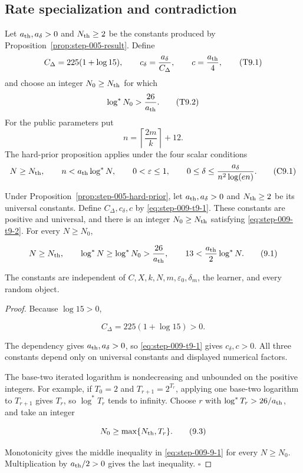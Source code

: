 \subsection{Rate specialization and contradiction}
\label{app:step-009}

Let $a_{\rm th},a_\delta>0$ and $N_{\rm th}\geq2$ be the constants
produced by Proposition~\ref{prop:step-005-result}.  Define
\[
C_\Delta=225(1+\log15),\qquad
c_\delta=\frac{a_\delta}{C_\Delta},\qquad
c=\frac{a_{\rm th}}4,
\tag{T9.1}\label{eq:step-009-t9-1}
\]
and choose an integer $N_0\geq N_{\rm th}$ for which
\[
\log^*N_0>\frac{26}{a_{\rm th}}.
\tag{T9.2}\label{eq:step-009-t9-2}
\]
For the public parameters put
\[
n=\left\lceil\frac{2m}{k}\right\rceil+12.
\tag{T9.3}\label{eq:step-009-t9-3}
\]
The hard-prior proposition applies under the four scalar conditions
\[
N\geq N_{\rm th},\qquad
n<a_{\rm th}\log^*N,
\qquad
0<\varepsilon\leq1,
\qquad
0\leq\delta\leq\frac{a_\delta}{n^2\log(en)}.
\tag{C9.1}\label{eq:step-009-c9-1}
\]



\begin{proposition}
\label{prop:step-009-constants}
Under Proposition~\ref{prop:step-005-hard-prior}, let
\(a_{\rm th},a_\delta>0\) and \(N_{\rm th}\ge2\) be its universal
constants.  Define \(C_\Delta,c_\delta,c\) by \eqref{eq:step-009-t9-1}.  These constants
are positive and universal, and there is an integer
\(N_0\ge N_{\rm th}\) satisfying \eqref{eq:step-009-t9-2}.  For every \(N\ge N_0\),

\[
N\ge N_{\rm th},
\qquad
\log^*N\ge\log^*N_0>\frac{26}{a_{\rm th}},
\qquad
13<\frac{a_{\rm th}}2\log^*N.
\tag{9.1}\label{eq:step-009-9-1}
\]

The constants are independent of
\(C,X,k,N,m,\varepsilon_0,\delta_m\), the learner, and every random
object.

\end{proposition}

\begin{proof}
Because \(\log 15>0\),

\[
C_\Delta=225(1+\log15)>0.
\tag{9.2}\label{eq:step-009-9-2}
\]

The dependency gives \(a_{\rm th},a_\delta>0\), so \eqref{eq:step-009-t9-1}
gives \(c_\delta,c>0\).  All three constants depend only on 
universal constants and displayed numerical factors.

The base-two iterated logarithm is nondecreasing and unbounded on the
positive integers.  For example, if \(T_0=2\) and
\(T_{r+1}=2^{T_r}\), applying one base-two logarithm to \(T_{r+1}\)
gives \(T_r\), so \(\log^* T_r\) tends to infinity.  Choose \(r\) with
\(\log^* T_r>26/a_{\rm th}\), and take an integer

\[
N_0\ge\max\{N_{\rm th},T_r\}.
\tag{9.3}\label{eq:step-009-9-3}
\]

Monotonicity gives the middle inequality in \eqref{eq:step-009-9-1} for every
\(N\ge N_0\).  Multiplication by \(a_{\rm th}/2>0\) gives the last
inequality.  \(\square\)

\end{proof}


